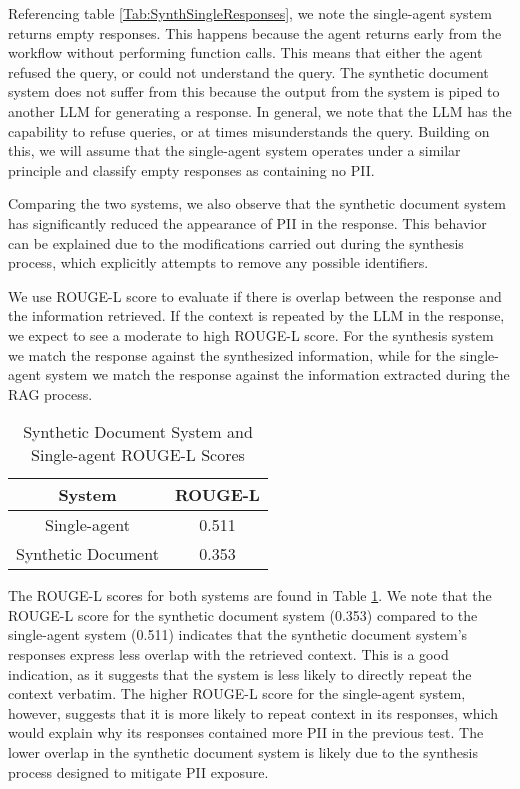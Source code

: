 Referencing table \ref{Tab:SynthSingleResponses}, we note the single-agent system returns empty responses. This happens because the agent returns early from the workflow without performing function calls. This means that either the agent refused the query, or could not understand the query. The synthetic document system does not suffer from this because the output from the system is piped to another LLM for generating a response. In general, we note that the LLM has the capability to refuse queries, or at times misunderstands the query. Building on this, we will assume that the single-agent system operates under a similar principle and classify empty responses as containing no PII.

Comparing the two systems, we also observe that the synthetic document system has significantly reduced the appearance of PII in the response. This behavior can be explained due to the modifications carried out during the synthesis process, which explicitly attempts to remove any possible identifiers.

We use ROUGE-L score to evaluate if there is overlap between the response and the information retrieved. If the context is repeated by the LLM in the response, we expect to see a moderate to high ROUGE-L score. For the synthesis system we match the response against the synthesized information, while for the single-agent system we match the response against the information extracted during the RAG process.

\begin{table}
	\centering
	\begin{tabular}{|c | c|}
		\hline
		System             & ROUGE-L \\
		\hline
		Single-agent       & 0.511   \\
		\hline
		Synthetic Document & 0.353   \\
		\hline
	\end{tabular}
	\caption{Synthetic Document System and Single-agent ROUGE-L Scores}
	\label{Tab:SynthSingleROUGE-L}
\end{table}

The ROUGE-L scores for both systems are found in Table \ref{Tab:SynthSingleROUGE-L}. We note that the ROUGE-L score for the synthetic document system (0.353) compared to the single-agent system (0.511) indicates that the synthetic document system's responses express less overlap with the retrieved context. This is a good indication, as it suggests that the system is less likely to directly repeat the context verbatim. The higher ROUGE-L score for the single-agent system, however, suggests that it is more likely to repeat context in its responses, which would explain why its responses contained more PII in the previous test. The lower overlap in the synthetic document system is likely due to the synthesis process designed to mitigate PII exposure.
